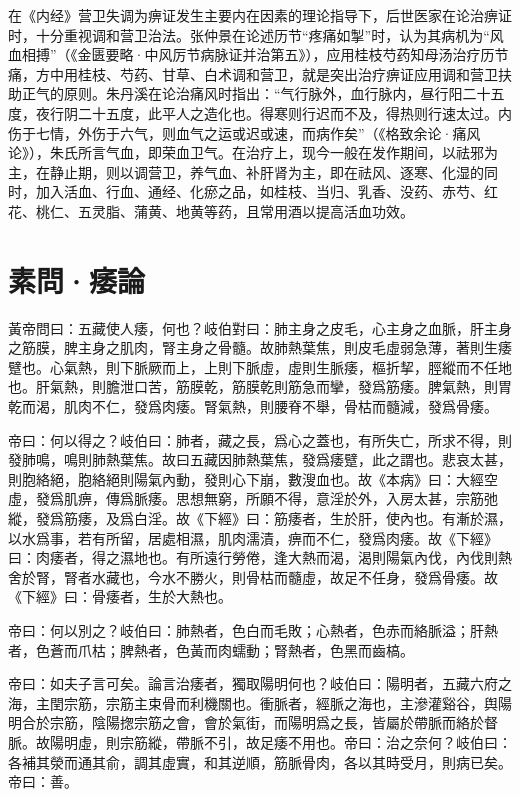 \documentclass[draft,12pt]{ctexbook}
\begin{document}


在《内经》营卫失调为痹证发生主要内在因素的理论指导下，后世医家在论治痹证时，十分重视调和营卫治法。张仲景在论述历节“疼痛如掣”时，认为其病机为“风血相搏”（《金匮要略·中风厉节病脉证并治第五》），应用桂枝芍药知母汤治疗历节痛，方中用桂枝、芍药、甘草、白术调和营卫，就是突出治疗痹证应用调和营卫扶助正气的原则。朱丹溪在论治痛风时指出：“气行脉外，血行脉内，昼行阳二十五度，夜行阴二十五度，此平人之造化也。得寒则行迟而不及，得热则行速太过。内伤于七情，外伤于六气，则血气之运或迟或速，而病作矣”（《格致余论·痛风论》），朱氏所言气血，即荣血卫气。在治疗上，现今一般在发作期间，以祛邪为主，在静止期，则以调营卫，养气血、补肝肾为主，即在祛风、逐寒、化湿的同时，加入活血、行血、通经、化瘀之品，如桂枝、当归、乳香、没药、赤芍、红花、桃仁、五灵脂、蒲黄、地黄等药，且常用酒以提高活血功效。

\section{素問·痿論}%


\begin{yuanwen}
黃帝問曰：五藏使人痿，何也？岐伯對曰：肺主身之皮毛，心主身之血脈，肝主身之筋膜，脾主身之肌肉，腎主身之骨髓。故肺熱葉焦，則皮毛虛弱急薄，著則生痿躄也。心氣熱，則下脈厥而上，上則下脈虛，虛則生脈痿，樞折挈，脛縱而不任地也。肝氣熱，則膽泄口苦，筋膜乾，筋膜乾則筋急而攣，發爲筋痿。脾氣熱，則胃乾而渴，肌肉不仁，發爲肉痿。腎氣熱，則腰脊不舉，骨枯而髓減，發爲骨痿。

帝曰：何以得之？岐伯曰：肺者，藏之長，爲心之蓋也，有所失亡，所求不得，則發肺鳴，鳴則肺熱葉焦。故曰五藏因肺熱葉焦，發爲痿躄，此之謂也。悲哀太甚，則胞絡絕，胞絡絕則陽氣內動，發則心下崩，數溲血也。故《本病》曰：大經空虛，發爲肌痹，傳爲脈痿。思想無窮，所願不得，意淫於外，入房太甚，宗筋弛縱，發爲筋痿，及爲白淫。故《下經》曰：筋痿者，生於肝，使內也。有漸於濕，以水爲事，若有所留，居處相濕，肌肉濡漬，痹而不仁，發爲肉痿。故《下經》曰：肉痿者，得之濕地也。有所遠行勞倦，逢大熱而渴，渴則陽氣內伐，內伐則熱舍於腎，腎者水藏也，今水不勝火，則骨枯而髓虛，故足不任身，發爲骨痿。故《下經》曰：骨痿者，生於大熱也。

帝曰：何以別之？岐伯曰：肺熱者，色白而毛敗；心熱者，色赤而絡脈溢；肝熱者，色蒼而爪枯；脾熱者，色黃而肉蠕動；腎熱者，色黑而齒槁。

帝曰：如夫子言可矣。論言治痿者，獨取陽明何也？岐伯曰：陽明者，五藏六府之海，主閏宗筋，宗筋主束骨而利機關也。衝脈者，經脈之海也，主滲灌谿谷，舆陽明合於宗筋，陰陽揔宗筋之會，會於氣街，而陽明爲之長，皆屬於帶脈而絡於督脈。故陽明虛，則宗筋縱，帶脈不引，故足痿不用也。帝曰：治之奈何？岐伯曰：各補其滎而通其俞，調其虛實，和其逆順，筋脈骨肉，各以其時受月，則病已矣。帝曰：善。
\end{yuanwen}
\end{document}
